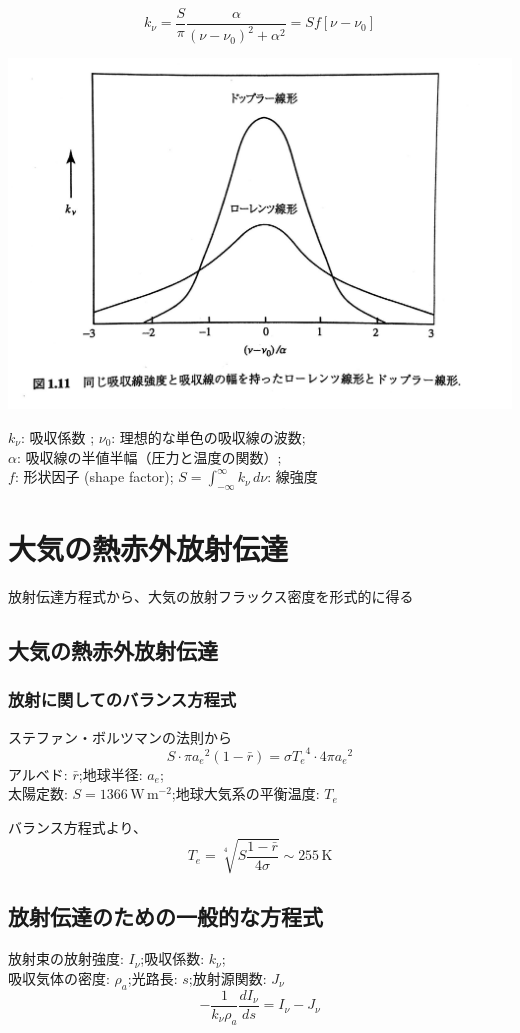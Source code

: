 \documentclass[article,nontitlepage,]{dennou777}
\newcommand{\centeralign}[1]{\rule{0pt}{0pt}\hfill#1\hfill\rule{0pt}{0pt}}
\newcommand{\Unit}[1]{\,\mathrm{#1}}
\begin{document}
\[k_\nu=\frac{S}{\pi}\frac{\alpha}{(\nu-\nu_0)^2+\alpha^2}=Sf[\nu-\nu_0]\]
\centeralign{\includegraphics[width=\textwidth]{lorentz.jpg}}

$k_\nu$: 吸収係数 ;\quad
$\nu_0$: 理想的な単色の吸収線の波数;\\
$\alpha$: 吸収線の半値半幅（圧力と温度の関数）;\\
$f$: 形状因子 (shape factor);\quad
$\displaystyle S=\int^\infty_{-\infty}k_\nu\,d\nu$: 線強度

\section{大気の熱赤外放射伝達}
放射伝達方程式から、大気の放射フラックス密度を形式的に得る

\subsection{大気の熱赤外放射伝達}
\subsubsection{放射に関してのバランス方程式}
ステファン・ボルツマンの法則から
\[S\cdot\pi{a_e}^2(1-\bar r)=\sigma{T_e}^4\cdot4\pi{a_e}^2\]
アルベド: $\bar r$;\quad 地球半径: $a_e$;\quad\\
太陽定数: $S=1366\Unit{W\,m^{-2}}$;\quad 地球大気系の平衡温度: $T_e$

バランス方程式より、
\[T_e=\sqrt[4]{S\frac{1-\bar r}{4\sigma}}\sim255\Unit{K}\]

\subsection{放射伝達のための一般的な方程式}
放射束の放射強度: $I_\nu$;\quad 吸収係数: $k_\nu$;\\
吸収気体の密度: $\rho_a$;\quad 光路長: $s$;\quad 放射源関数: $J_\nu$
\[-\frac{1}{k_\nu \rho_a}\frac{dI_\nu}{ds}=I_\nu-J_\nu\]
\end{document}
